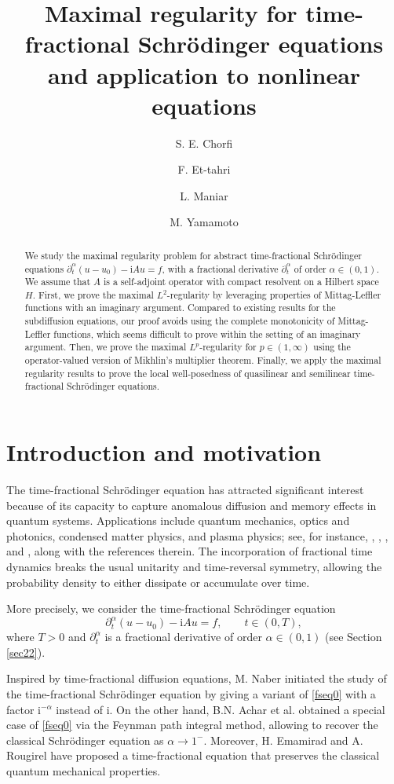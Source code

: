 \documentclass[reqno]{amsart}
\title[Maximal regularity for time-fractional Schrödinger equations]{Maximal regularity for time-fractional Schrödinger equations and application to nonlinear equations}
\author{S. E. Chorfi}
\author{F. Et-tahri}
\author{L. Maniar}
\author{M. Yamamoto}
\numberwithin{equation}{section}
\begin{document}
\begin{abstract}
We study the maximal regularity problem for abstract time-fractional Schrödinger equations $\partial_t^\alpha(u-u_0) -\mathrm{i} A u=f$, with a fractional derivative $\partial_t^\alpha$ of order $\alpha \in (0,1)$. We assume that $A$ is a self-adjoint operator with compact resolvent on a Hilbert space $H$. First, we prove the maximal $L^2$-regularity by leveraging properties of Mittag-Leffler functions with an imaginary argument. Compared to existing results for the subdiffusion equations, our proof avoids using the complete monotonicity of Mittag-Leffler functions, which seems difficult to prove within the setting of an imaginary argument. Then, we prove the maximal $L^p$-regularity for $p\in (1,\infty)$ using the operator-valued version of Mikhlin's multiplier theorem. Finally, we apply the maximal regularity results to prove the local well-posedness of quasilinear and semilinear time-fractional Schr\"odinger equations.
\end{abstract}

\maketitle

\section{Introduction and motivation}
The time-fractional Schrödinger equation has attracted significant interest because of its capacity to capture anomalous diffusion and memory effects in quantum systems. Applications include quantum mechanics, optics and photonics, condensed matter physics, and plasma physics; see, for instance, \cite{Gr19}, \cite{La18}, \cite{CC23}, and \cite{Wang07}, along with the references therein. The incorporation of fractional time dynamics breaks the usual unitarity and time-reversal symmetry, allowing the probability density to either dissipate or accumulate over time.

More precisely, we consider the time-fractional Schrödinger equation 
\begin{equation}\label{fseq0}
\partial_t^\alpha(u-u_0) -\mathrm{i} Au=f, \qquad t \in (0,T),
\end{equation}
where $T>0$ and $\partial_t^\alpha$ is a fractional derivative of order $\alpha\in (0,1)$ (see Section \ref{sec22}).

Inspired by time-fractional diffusion equations, M. Naber \cite{Na04} initiated the study of the time-fractional Schrödinger equation by giving a variant of \eqref{fseq0} with a factor $\mathrm{i}^{-\alpha}$ instead of $\mathrm{i}$. On the other hand, B.N. Achar et al. \cite{Ach13} obtained a special case of \eqref{fseq0} via the Feynman path integral method, allowing to recover the classical Schrödinger equation as $\alpha\to 1^-$. Moreover, H. Emamirad and A. Rougirel \cite{ER20} have proposed a time-fractional equation that preserves the classical quantum mechanical properties.
\end{document}
